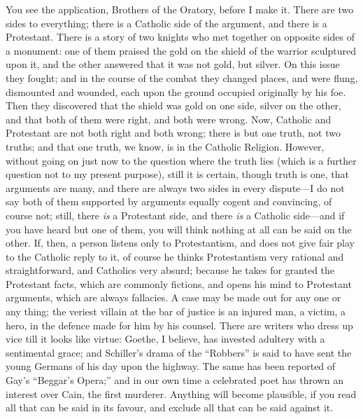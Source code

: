 You see the application, Brothers of the Oratory,
before I make it. There are two sides to everything;
there is a Catholic side of the argument, and there is a
Protestant. There is a story of two knights who met
together on opposite sides of a monument: one of them
praised the gold on the shield of the warrior sculptured
upon it, and the other answered that it was not gold, but
silver. On this issue they fought; and in the course of
the combat they changed places, and were flung,
dismounted and wounded, each upon the ground occupied
originally by his foe. Then they discovered that the
shield was gold on one side, silver on the other, and
that both of them were right, and both were wrong. Now,
Catholic and Protestant are not both right and both
wrong; there is but one truth, not two truths; and that
one truth, we know, is in the Catholic Religion. However,
without going on just now to the question where the truth
lies (which is a further question not to my present
purpose), still it is certain, though truth is one, that
arguments are many, and there are always two sides in
every dispute—I do not say both of them supported by
arguments equally cogent and convincing, of course not;
still, there \emph{is} a Protestant side, and there \emph{is}
a Catholic side—and if you have heard but one of
them, you will think nothing at all can be said on the
other. If, then, a person listens only to Protestantism,
and does not give fair play to the Catholic reply to it,
of course he thinks Protestantism very rational and
straightforward, and Catholics very absurd; because he
takes for granted the Protestant facts, which are
commonly fictions, and opens his mind to Protestant
arguments, which are always fallacies. A case may be made
out for any one or any thing; the veriest villain at the
bar of justice is an injured man, a victim, a hero, in
the defence made for him by his counsel. There are
writers who dress up vice till it looks like virtue:
Goethe, I believe, has invested adultery with a
sentimental grace; and Schiller's drama of the
``Robbers'' is said to have sent the young
Germans of his day upon the highway. The same has been
reported of Gay's ``Beggar's Opera;'' and in our
own time a celebrated poet has thrown an interest over
Cain, the first murderer. Anything will become plausible,
if you read all that can be said in its favour, and
exclude all that can be said against it.

